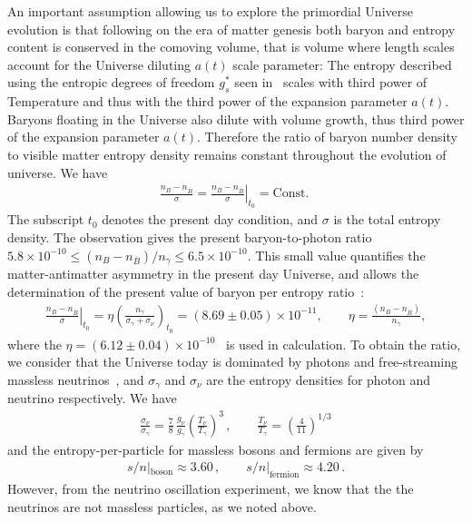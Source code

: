 An important assumption allowing us to explore the primordial Universe evolution is that following on the era of matter genesis both baryon and entropy content is conserved in the comoving volume, that is volume where length scales account for the Universe diluting $a(t)$ scale parameter: The entropy described using the entropic degrees of freedom $g^\ast_s$ seen in~ scales with third power of Temperature and thus with the third power of the expansion parameter $a(t)$. Baryons floating in the Universe also dilute with volume growth, thus third power of the expansion parameter $a(t)$. Therefore the ratio of baryon number density to visible matter entropy density remains constant throughout the evolution of universe. We have
\begin{align}
\frac{n_B-n_{\overline{B}}}{\sigma}= \left.\frac{n_B-n_{\overline{B}}}{ \sigma}\right|_{t_0}=\mathrm{Const.}\;
\end{align}
The subscript $t_0$ denotes the present day condition, and $\sigma$ is the total entropy density.
The observation gives the present baryon-to-photon ratio ~\cite{ParticleDataGroup:2022pth} $5.8 \times 10^{-10} \leqslant(n_B-n_{\overline{B}})/n_\gamma\leqslant6.5\times10^{-10}$. This small value quantifies the matter-antimatter asymmetry in the present day Universe, and allows the determination of the present value of baryon per entropy ratio~\cite{Rafelski:2019twp,Fromerth:2002wb,Fromerth:2012fe}:
\begin{align}\label{BaryonEntropyRatio}
\left.\frac{n_B-n_{\overline{B}}}{ \sigma}\right|_{t_0}=\eta\left(\frac{n_\gamma}{\sigma_\gamma+\sigma_\nu}\right)_{\!t_0}\!\!\!\!=(8.69\pm0.05)\!\!\times\!\!10^{-11},\qquad \eta=\frac{(n_B-n_{\overline{B}})}{n_\gamma},
\end{align}
where the $\eta=(6.12\pm0.04)\times10^{-10}$~\cite{ParticleDataGroup:2022pth} is used in calculation. To obtain the ratio, we consider that the Universe today is dominated by photons and free-streaming massless neutrinos~\cite{Birrell:2012gg}, and $\sigma_\gamma$ and $\sigma_\nu$ are the entropy densities for photon and neutrino respectively. We have
\begin{align}
 \frac{\sigma_\nu}{\sigma_\gamma}=\frac{7}{8}\,\frac{g_\nu}{g_\gamma}\left(\frac{T_\nu}{T_\gamma}\right)^3\,,\qquad\frac{T_\nu}{T_\gamma}=\left(\frac{4}{11}\right)^{1/3}
\end{align}
and the entropy-per-particle for massless bosons and fermions are given by~\cite{Fromerth:2012fe}
\begin{align}
s/n|_\mathrm{boson}\approx 3.60\,,\qquad
s/n|_\mathrm{fermion}\approx 4.20\,.
\end{align}
However, from the neutrino oscillation experiment, we know that the the neutrinos are not massless particles, as we noted above. 
 

